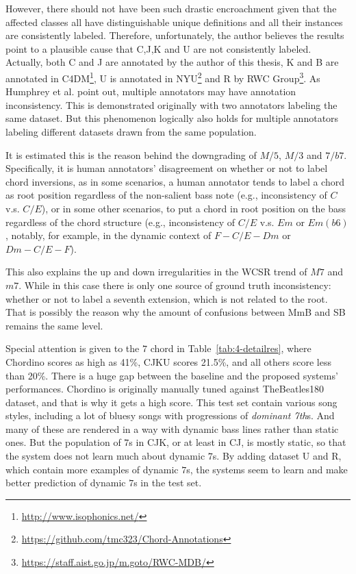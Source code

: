 However, there should not have been such drastic encroachment given that the affected classes all have distinguishable unique definitions and all their instances are consistently labeled. Therefore, unfortunately, the author believes the results point to a plausible cause that C,J,K and U are not consistently labeled. Actually, both C and J are annotated by the author of this thesis, K and B are annotated in C4DM\footnote{\url{http://www.isophonics.net/}}, U is annotated in NYU\footnote{\url{https://github.com/tmc323/Chord-Annotations}} and R by RWC Group\footnote{\url{https://staff.aist.go.jp/m.goto/RWC-MDB/}}. As Humphrey et al. \cite{humphreyfour} point out, multiple annotators may have annotation inconsistency. This is demonstrated originally with two annotators labeling the same dataset. But this phenomenon logically also holds for multiple annotators labeling different datasets drawn from the same population.

It is estimated this is the reason behind the downgrading of $M/5$, $M/3$ and $7/b7$. Specifically, it is human annotators' disagreement on whether or not to label chord inversions, as in some scenarios, a human annotator tends to label a chord as root position regardless of the non-salient bass note (e.g., inconsistency of $C$ v.s. $C/E$), or in some other scenarios, to put a chord in root position on the bass regardless of the chord structure (e.g., inconsistency of $C/E$ v.s. $Em$ or $Em(b6)$, notably, for example, in the dynamic context of $F-C/E-Dm$ or $Dm-C/E-F$).

This also explains the up and down irregularities in the WCSR trend of $M7$ and $m7$. While in this case there is only one source of ground truth inconsistency: whether or not to label a seventh extension, which is not related to the root. That is possibly the reason why the amount of confusions between MmB and SB remains the same level.

Special attention is given to the $7$ chord in Table~\ref{tab:4-detailres}, where Chordino scores as high as 41\%, CJKU scores 21.5\%, and all others score less than 20\%. There is a huge gap between the baseline and the proposed systems' performances. Chordino is originally manually tuned against TheBeatles180 dataset, and that is why it gets a high score. This test set contain various song styles, including a lot of bluesy songs with progressions of \textit{dominant 7th}s. And many of these are rendered in a way with dynamic bass lines rather than static ones. But the population of $7$s in CJK, or at least in CJ, is mostly static, so that the system does not learn much about dynamic $7$s. By adding dataset U and R, which contain more examples of dynamic $7$s, the systems seem to learn and make better prediction of dynamic $7$s in the test set.

